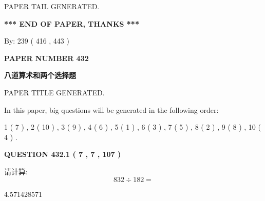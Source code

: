 \documentclass{ctexart}
\begin{document}
   
   
\vspace{2.0in} PAPER TAIL GENERATED.
   
   
   
   
\vspace{1.0in} 
{\textbf{\large{ *** END OF PAPER, THANKS *** }}} 
   
   
\hspace{1.0in} By: 
 239 ( 416 ,  443 )
   
   
   
   
\newpage 
\setcounter{page}{ 
   432001 } 
   
   
   
   
 {\textbf{ \Large{ PAPER NUMBER  432  }}}
   
   
\vspace{0.2in}
   
   
   
   
   
   
   
   
 \vspace{0.2in}
{\LARGE {\textbf{ 八道算术和两个选择题}}}
   
   
 PAPER TITLE GENERATED.
   
   
   
\vspace{0.2in}
   
In this paper, big questions will be generated in the following order: 
   
   
   1 ( 7 )
 ,
   2 ( 10 )
 ,
   3 ( 9 )
 ,
   4 ( 6 )
 ,
   5 ( 1 )
 ,
   6 ( 3 )
 ,
   7 ( 5 )
 ,
   8 ( 2 )
 ,
   9 ( 8 )
 ,
   10 ( 4 )
 .
  
\vspace{0.2in}
  
{\textbf{\Large{QUESTION
432.1 
 ( 7 , 7 , 107 )
}}}
  
  
 
请计算:
\begin{equation}
832  \div    %
182 = \nonumber
\end{equation}
 
 
 
\noindent{}
 
 

4.571428571
 
 
\noindent{}
 
\end{document}
